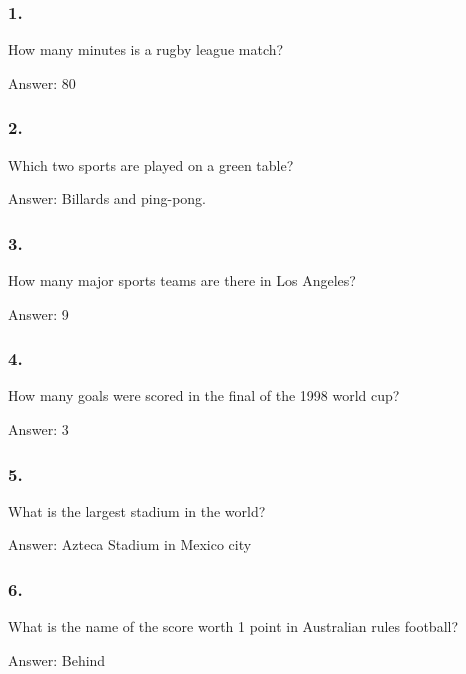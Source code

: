 \documentclass{beamer}
\begin{document}
    \begin{frame}
        \frametitle{1.}
        How many minutes is a rugby league match?\\

        \begin{center}
            Answer: 80
        \end{center}
    \end{frame}

    \begin{frame}
        \frametitle{2.}
        Which two sports are played on a green table?\\

        \begin{center}
            Answer: Billards and ping-pong.
        \end{center}
    \end{frame}

    \begin{frame}
        \frametitle{3.}
        How many major sports teams are there in Los Angeles?\\

        \begin{center}
            Answer: 9
        \end{center}
    \end{frame}

    \begin{frame}
        \frametitle{4.}
        How many goals were scored in the final of the 1998 world cup?\\

        \begin{center}
            Answer: 3
        \end{center}
    \end{frame}

    \begin{frame}
        \frametitle{5.}
        What is the largest stadium in the world?\\

        \begin{center}
            Answer: Azteca Stadium in Mexico city
        \end{center}
    \end{frame}

    \begin{frame}
        \frametitle{6.}
        What is the name of the score worth 1 point in Australian rules
        football?\\

        \begin{center}
            Answer: Behind
        \end{center}
    \end{frame}
\end{document}
